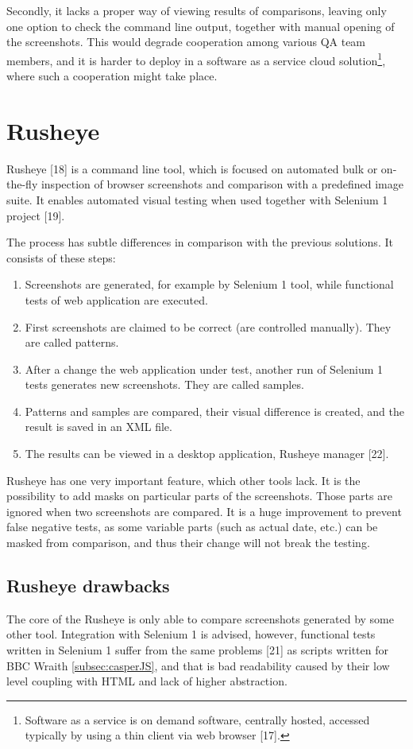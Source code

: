\documentclass[11pt,oneside,final]{fithesis2}
\begin{document}
   Secondly, it lacks a proper way of viewing results of comparisons, leaving only one option to check the command line output, together with manual opening of the screenshots. This would degrade
   cooperation among various QA team members, and it is harder to deploy in a software as a service cloud solution\footnote{Software as a service is on demand software, centrally hosted, 
   accessed typically by using a thin client via web browser [17].}, where such a cooperation might take place.

  \section{Rusheye}
  \label{sec:rusheye}
  Rusheye [18] is a command line tool, which is focused on automated bulk or on-the-fly inspection of browser screenshots and comparison with a predefined image suite. It enables automated
  visual testing when used together with Selenium 1 project [19].
  
  The process has subtle differences in comparison with the previous solutions. It consists of these steps:
  
  \begin{enumerate}
   \item Screenshots are generated, for example by Selenium 1 tool, while functional tests of web application are executed.
   \item First screenshots are claimed to be correct (are controlled manually). They are called patterns.
   \item After a change the web application under test, another run of Selenium 1 tests generates new screenshots. They are called samples.
   \item Patterns and samples are compared, their visual difference is created, and the result is saved in an XML file.
   \item The results can be viewed in a desktop application, Rusheye manager [22].
  \end{enumerate}
  
  Rusheye has one very important feature, which other tools lack. It is the possibility to add masks on particular parts of the screenshots. Those parts are ignored when two screenshots are
  compared. It is a huge improvement to prevent false negative tests, as some variable parts (such as actual date, etc.) can be masked from comparison, and thus their change
  will not break the testing.
  
  \subsection{Rusheye drawbacks}
  The core of the Rusheye is only able to compare screenshots generated by some other tool. Integration with Selenium 1 is advised, however, functional tests written in Selenium 1 suffer
  from the same problems [21] as scripts written for BBC Wraith \ref{subsec:casperJS}, and that is bad readability caused by their low level coupling with HTML and lack of higher abstraction.
  
\end{document}
